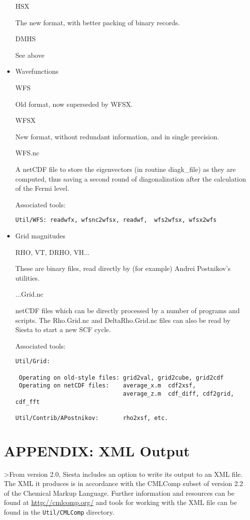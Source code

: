 \documentclass[11pt]{article}
\begin{document}
\begin{itemize}
HSX

The new format, with better packing of binary records.

DMHS

See above

\item{Wavefunctions}

WFS

Old format, now superseded by WFSX.

WFSX

New format, without redundant information, and in single precision.

WFS.nc

A netCDF file to store the eigenvectors (in routine diagk\_file) as they
are computed, thus saving a second round of diagonalization after the
calculation of the Fermi level.

Associated tools:
\begin{verbatim}
Util/WFS: readwfx, wfsnc2wfsx, readwf,  wfs2wfsx, wfsx2wfs
\end{verbatim}

\item{Grid magnitudes}

RHO, VT, DRHO, VH...

These are binary files, read directly by (for example) Andrei
Postnikov's utilities.

...Grid.nc

netCDF files which can be directly processed by a number of programs
and scripts.  The Rho.Grid.nc and DeltaRho.Grid.nc files can also be
read by Siesta to start a new SCF cycle.

Associated tools:

\begin{verbatim}
Util/Grid:

 Operating on old-style files: grid2val, grid2cube, grid2cdf
 Operating on netCDF files:    average_x.m	cdf2xsf,
                               average_z.m  cdf_diff, cdf2grid, cdf_fft

Util/Contrib/APostnikov:       rho2xsf, etc.

\end{verbatim}
\end{itemize}

\newpage
\section{APPENDIX: XML Output}

>From version 2.0, {\sc Siesta} includes an option to write its output to an
XML file. The XML it produces is in accordance with the CMLComp subset of
version 2.2 of the Chemical Markup Language. Further information
and resources can be found at \url{http://cmlcomp.org/} and tools for working
with the XML file can be found in the \texttt{Util/CMLComp} directory.
\end{document}
